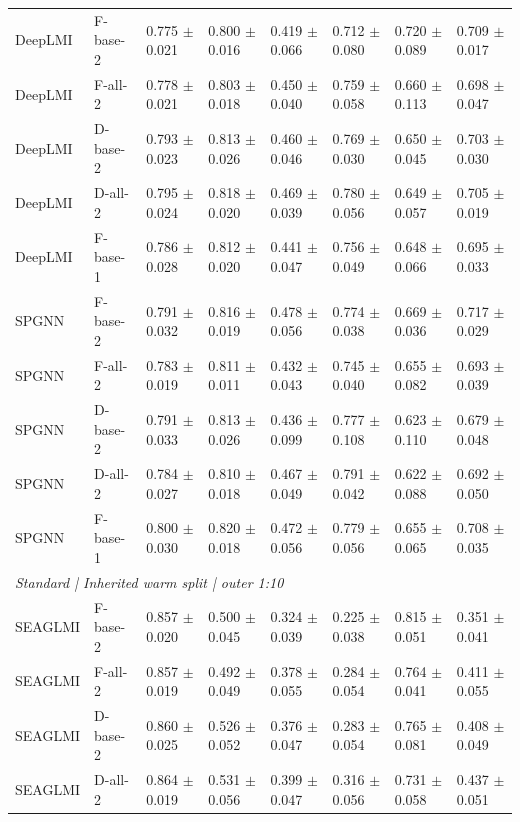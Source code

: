 \begin{landscape}
{\begin{longtable}{llllllll}
DeepLMI & F-base-2 & 0.775 $\pm$ 0.021 & 0.800 $\pm$ 0.016 & 0.419 $\pm$ 0.066 & 0.712 $\pm$ 0.080 & 0.720 $\pm$ 0.089 & 0.709 $\pm$ 0.017 \\
DeepLMI & F-all-2 & 0.778 $\pm$ 0.021 & 0.803 $\pm$ 0.018 & 0.450 $\pm$ 0.040 & 0.759 $\pm$ 0.058 & 0.660 $\pm$ 0.113 & 0.698 $\pm$ 0.047 \\
DeepLMI & D-base-2 & 0.793 $\pm$ 0.023 & 0.813 $\pm$ 0.026 & 0.460 $\pm$ 0.046 & 0.769 $\pm$ 0.030 & 0.650 $\pm$ 0.045 & 0.703 $\pm$ 0.030 \\
DeepLMI & D-all-2 & 0.795 $\pm$ 0.024 & 0.818 $\pm$ 0.020 & 0.469 $\pm$ 0.039 & 0.780 $\pm$ 0.056 & 0.649 $\pm$ 0.057 & 0.705 $\pm$ 0.019 \\
DeepLMI & F-base-1 & 0.786 $\pm$ 0.028 & 0.812 $\pm$ 0.020 & 0.441 $\pm$ 0.047 & 0.756 $\pm$ 0.049 & 0.648 $\pm$ 0.066 & 0.695 $\pm$ 0.033 \\
SPGNN & F-base-2 & 0.791 $\pm$ 0.032 & 0.816 $\pm$ 0.019 & 0.478 $\pm$ 0.056 & 0.774 $\pm$ 0.038 & 0.669 $\pm$ 0.036 & 0.717 $\pm$ 0.029 \\
SPGNN & F-all-2 & 0.783 $\pm$ 0.019 & 0.811 $\pm$ 0.011 & 0.432 $\pm$ 0.043 & 0.745 $\pm$ 0.040 & 0.655 $\pm$ 0.082 & 0.693 $\pm$ 0.039 \\
SPGNN & D-base-2 & 0.791 $\pm$ 0.033 & 0.813 $\pm$ 0.026 & 0.436 $\pm$ 0.099 & 0.777 $\pm$ 0.108 & 0.623 $\pm$ 0.110 & 0.679 $\pm$ 0.048 \\
SPGNN & D-all-2 & 0.784 $\pm$ 0.027 & 0.810 $\pm$ 0.018 & 0.467 $\pm$ 0.049 & 0.791 $\pm$ 0.042 & 0.622 $\pm$ 0.088 & 0.692 $\pm$ 0.050 \\
SPGNN & F-base-1 & 0.800 $\pm$ 0.030 & 0.820 $\pm$ 0.018 & 0.472 $\pm$ 0.056 & 0.779 $\pm$ 0.056 & 0.655 $\pm$ 0.065 & 0.708 $\pm$ 0.035 \\
\multicolumn{8}{l}{\textit{Standard | Inherited warm split | outer 1:10}}\\
SEAGLMI & F-base-2 & 0.857 $\pm$ 0.020 & 0.500 $\pm$ 0.045 & 0.324 $\pm$ 0.039 & 0.225 $\pm$ 0.038 & 0.815 $\pm$ 0.051 & 0.351 $\pm$ 0.041 \\
SEAGLMI & F-all-2 & 0.857 $\pm$ 0.019 & 0.492 $\pm$ 0.049 & 0.378 $\pm$ 0.055 & 0.284 $\pm$ 0.054 & 0.764 $\pm$ 0.041 & 0.411 $\pm$ 0.055 \\
SEAGLMI & D-base-2 & 0.860 $\pm$ 0.025 & 0.526 $\pm$ 0.052 & 0.376 $\pm$ 0.047 & 0.283 $\pm$ 0.054 & 0.765 $\pm$ 0.081 & 0.408 $\pm$ 0.049 \\
SEAGLMI & D-all-2 & 0.864 $\pm$ 0.019 & 0.531 $\pm$ 0.056 & 0.399 $\pm$ 0.047 & 0.316 $\pm$ 0.056 & 0.731 $\pm$ 0.058 & 0.437 $\pm$ 0.051 \\

\end{longtable}}
\end{landscape}
